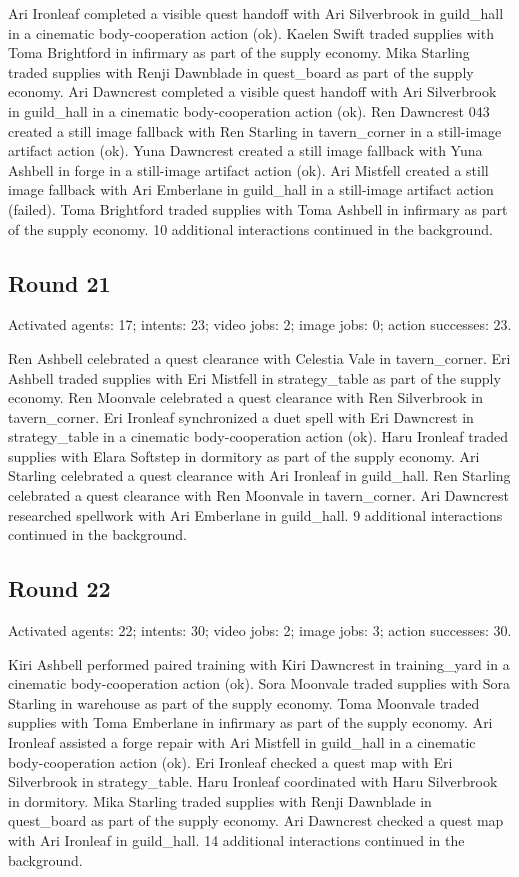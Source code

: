 \documentclass[11pt,a4paper]{article}
\begin{document}
Ari Ironleaf completed a visible quest handoff with Ari Silverbrook in guild\_hall in a cinematic body-cooperation action (ok). Kaelen Swift traded supplies with Toma Brightford in infirmary as part of the supply economy. Mika Starling traded supplies with Renji Dawnblade in quest\_board as part of the supply economy. Ari Dawncrest completed a visible quest handoff with Ari Silverbrook in guild\_hall in a cinematic body-cooperation action (ok). Ren Dawncrest 043 created a still image fallback with Ren Starling in tavern\_corner in a still-image artifact action (ok). Yuna Dawncrest created a still image fallback with Yuna Ashbell in forge in a still-image artifact action (ok). Ari Mistfell created a still image fallback with Ari Emberlane in guild\_hall in a still-image artifact action (failed). Toma Brightford traded supplies with Toma Ashbell in infirmary as part of the supply economy. 10 additional interactions continued in the background.

\subsection{Round 21}
Activated agents: 17; intents: 23; video jobs: 2; image jobs: 0; action successes: 23.

Ren Ashbell celebrated a quest clearance with Celestia Vale in tavern\_corner. Eri Ashbell traded supplies with Eri Mistfell in strategy\_table as part of the supply economy. Ren Moonvale celebrated a quest clearance with Ren Silverbrook in tavern\_corner. Eri Ironleaf synchronized a duet spell with Eri Dawncrest in strategy\_table in a cinematic body-cooperation action (ok). Haru Ironleaf traded supplies with Elara Softstep in dormitory as part of the supply economy. Ari Starling celebrated a quest clearance with Ari Ironleaf in guild\_hall. Ren Starling celebrated a quest clearance with Ren Moonvale in tavern\_corner. Ari Dawncrest researched spellwork with Ari Emberlane in guild\_hall. 9 additional interactions continued in the background.

\subsection{Round 22}
Activated agents: 22; intents: 30; video jobs: 2; image jobs: 3; action successes: 30.

Kiri Ashbell performed paired training with Kiri Dawncrest in training\_yard in a cinematic body-cooperation action (ok). Sora Moonvale traded supplies with Sora Starling in warehouse as part of the supply economy. Toma Moonvale traded supplies with Toma Emberlane in infirmary as part of the supply economy. Ari Ironleaf assisted a forge repair with Ari Mistfell in guild\_hall in a cinematic body-cooperation action (ok). Eri Ironleaf checked a quest map with Eri Silverbrook in strategy\_table. Haru Ironleaf coordinated with Haru Silverbrook in dormitory. Mika Starling traded supplies with Renji Dawnblade in quest\_board as part of the supply economy. Ari Dawncrest checked a quest map with Ari Ironleaf in guild\_hall. 14 additional interactions continued in the background.
\end{document}
